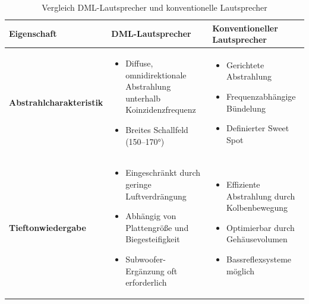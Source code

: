 \begin{table}[htbp]
\centering
\caption{Vergleich DML-Lautsprecher und konventionelle Lautsprecher}
\label{tab:dml_konventionell_vergleich}
\footnotesize
\setlength{\tabcolsep}{3pt}
\begin{tabularx}{\textwidth}{|X|X|X|}
\hline
\textbf{Eigenschaft} & \textbf{DML-Lautsprecher} & \textbf{Konventioneller Lautsprecher} \\
\hline
\textbf{Abstrahl\-charakteristik} &
\vspace{-2mm}
\begin{itemize}[leftmargin=*, nosep, topsep=0pt, parsep=0pt]
    \item Diffuse, omnidirektionale Abstrahlung unterhalb Koinzidenzfrequenz
    \item Breites Schallfeld (150--170°)
\end{itemize}
\vspace{-2mm}
&
\vspace{-2mm}
\begin{itemize}[leftmargin=*, nosep, topsep=0pt, parsep=0pt]
    \item Gerichtete Abstrahlung
    \item Frequenzabhängige Bündelung
    \item Definierter Sweet Spot
\end{itemize}
\vspace{-2mm} \\
\hline
\textbf{Tiefton\-wiedergabe} &
\vspace{-2mm}
\begin{itemize}[leftmargin=*, nosep, topsep=0pt, parsep=0pt]
    \item Eingeschränkt durch geringe Luftverdrängung
    \item Abhängig von Plattengröße und Biegesteifigkeit
    \item Subwoofer-Ergänzung oft erforderlich
\end{itemize}
\vspace{-2mm}
&
\vspace{-2mm}
\begin{itemize}[leftmargin=*, nosep, topsep=0pt, parsep=0pt]
    \item Effiziente Abstrahlung durch Kolbenbewegung
    \item Optimierbar durch Gehäusevolumen
    \item Bassreflexsysteme möglich
\end{itemize}
\vspace{-2mm} \\

\end{tabularx}
\end{table}
